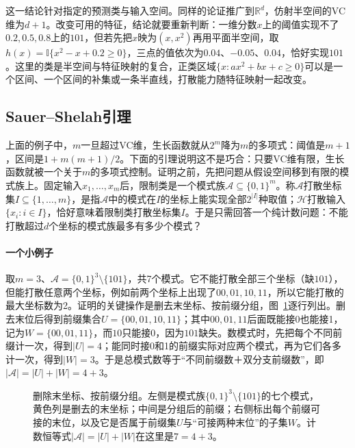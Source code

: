 这一结论针对指定的预测类与输入空间。同样的论证推广到$\mathbb R^d$，仿射半空间的VC维为$d+1$。改变可用的特征，结论就要重新判断：一维分数$x$上的阈值实现不了$0.2,0.5,0.8$上的$101$，但若先把$x$映为$(x,x^2)$再用平面半空间，取$h(x)=\mathbb I\{x^2-x+0.2\geq0\}$，三点的值依次为$0.04$、$-0.05$、$0.04$，恰好实现$101$。这里的类是半空间与特征映射的复合，正类区域$\{x:ax^2+bx+c\geq0\}$可以是一个区间、一个区间的补集或一条半直线，打散能力随特征映射一起改变。

\subsection{Sauer--Shelah引理}
\label{sec:binary-growth-sauer}

上面的例子中，$m$一旦超过VC维，生长函数就从$2^m$降为$m$的多项式：阈值是$m+1$，区间是$1+m(m+1)/2$。下面的引理说明这不是巧合：只要VC维有限，生长函数就被一个关于$m$的多项式控制。证明之前，先把问题从假设空间移到有限的模式族上。固定输入$x_1,\ldots,x_m$后，限制类是一个模式族$\mathcal A\subseteq\{0,1\}^m$。称$\mathcal A$打散坐标集$I\subseteq\{1,\ldots,m\}$，是指$\mathcal A$中的模式在$I$的坐标上能实现全部$2^{|I|}$种取值；$\mathcal H$打散输入$\{x_i:i\in I\}$，恰好意味着限制类打散坐标集$I$。于是只需回答一个纯计数问题：不能打散超过$d$个坐标的模式族最多有多少个模式？

\paragraph{一个小例子}
取$m=3$、$\mathcal A=\{0,1\}^3\setminus\{101\}$，共7个模式。它不能打散全部三个坐标（缺$101$），但能打散任意两个坐标，例如前两个坐标上出现了$00,01,10,11$，所以它能打散的最大坐标数为2。证明的关键操作是删去末坐标、按前缀分组，图~\ref{fig:lt5-sauer-prefix-split}逐行列出。删去末位后得到前缀集合$U=\{00,01,10,11\}$；其中$00,01,11$后面既能接0也能接1，记为$W=\{00,01,11\}$，而$10$只能接0，因为$101$缺失。数模式时，先把每个不同前缀计一次，得到$|U|=4$；能同时接0和1的前缀实际对应两个模式，再为它们各多计一次，得到$|W|=3$。于是总模式数等于“不同前缀数＋双分支前缀数”，即$|\mathcal A|=|U|+|W|=4+3$。

\begin{figure}[htbp]
  \centering
  
  \caption{删除末坐标、按前缀分组。左侧是模式族$\{0,1\}^3\setminus\{101\}$的七个模式，黄色列是删去的末坐标；中间是分组后的前缀；右侧标出每个前缀可接的末位，以及它是否属于前缀集$U$与“可接两种末位”的子集$W$。计数恒等式$|\mathcal A|=|U|+|W|$在这里是$7=4+3$。}
  \label{fig:lt5-sauer-prefix-split}
\end{figure}

